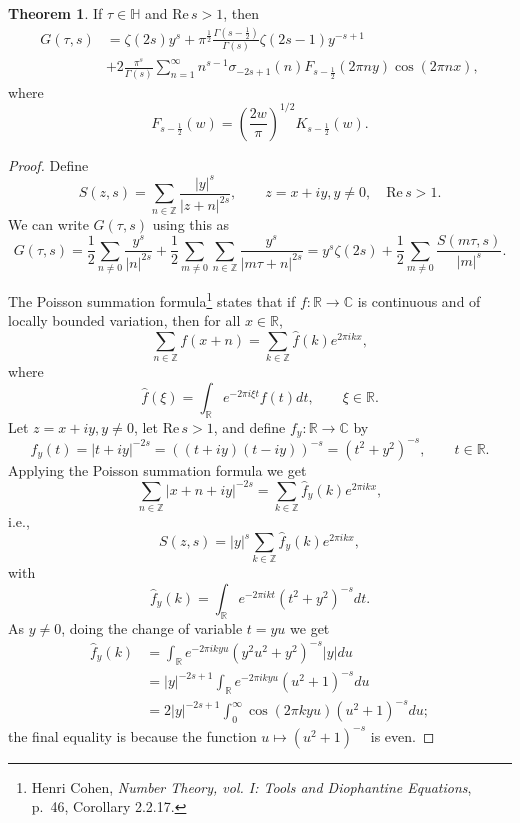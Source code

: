 \documentclass{article}
\def\Re{\ensuremath{\mathrm{Re}}\,}
\theoremstyle{definition}
\newtheorem{theorem}{Theorem}
\theoremstyle{definition}
\begin{document}
\begin{theorem}
If  $\tau \in \mathbb{H}$ and $\Re s>1$, then
\begin{align*}
G(\tau,s)&= \zeta(2s)y^s   +\pi^{\frac{1}{2}} \frac{ \Gamma\left(s-\frac{1}{2}\right)}{\Gamma(s)}  \zeta(2s-1)y^{-s+1}\\
&+2 \frac{\pi^s}{\Gamma(s)} \sum_{n=1}^\infty n^{s-1} \sigma_{-2s+1}(n) F_{s-\frac{1}{2}}(2\pi ny) \cos(2\pi nx),
\end{align*}
where
\[
F_{s-\frac{1}{2}}(w)=\left(\frac{2w}{\pi}\right)^{1/2} K_{s-\frac{1}{2}}(w).
\]
\label{GFourier}
\end{theorem}
\begin{proof}
Define 
\[
S(z,s) = \sum_{n \in \mathbb{Z}} \frac{|y|^s}{|z+n|^{2s}}, \qquad z=x+iy, y\neq 0,
\quad \Re s >1.
\]
We can write $G(\tau,s)$ using this as
\[
G(\tau,s)=\frac{1}{2} \sum_{n \neq 0} \frac{y^s}{|n|^{2s}}
+\frac{1}{2} \sum_{m \neq 0} \sum_{n \in \mathbb{Z}} \frac{y^s}{|m\tau+n|^{2s}}
=y^s \zeta(2s) +\frac{1}{2}\sum_{m \neq 0} \frac{S(m\tau,s)}{|m|^s}.
\]

The Poisson summation formula\footnote{Henri Cohen, {\em Number Theory, vol. I: Tools and Diophantine Equations}, p.~46, Corollary 2.2.17.}
states that if $f:\mathbb{R} \to \mathbb{C}$ is continuous and of locally  bounded variation, then
for all $x \in \mathbb{R}$,
\[
\sum_{n \in \mathbb{Z}} f(x+n) = \sum_{k \in \mathbb{Z}} \widehat{f}(k) e^{2\pi ikx},
\]
where
\[
\widehat{f}(\xi) = \int_\mathbb{R} e^{-2\pi i\xi t} f(t) dt, \qquad \xi \in \mathbb{R}.
\]
Let $z=x+iy, y \neq 0$, let $\Re s>1$, and define $f_y:\mathbb{R} \to \mathbb{C}$ by
\[
f_y(t)=|t+iy|^{-2s} =((t+iy)(t-iy))^{-s} = (t^2+y^2)^{-s}, \qquad t \in \mathbb{R}.
\]
Applying the Poisson summation formula we get
\[
\sum_{n \in \mathbb{Z}} |x+n+iy|^{-2s} = \sum_{k \in \mathbb{Z}} \widehat{f}_y(k) e^{2\pi ikx},
\]
i.e.,
\begin{equation}
S(z,s) = |y|^s \sum_{k \in \mathbb{Z}} \widehat{f}_y(k) e^{2\pi ikx},
\label{SPoisson}
\end{equation}
with
\[
\widehat{f}_y(k) = \int_{\mathbb{R}} e^{-2\pi ikt} (t^2+y^2)^{-s} dt.
\]
As $y \neq 0$, doing the change of variable $t=yu$ we get
\begin{align*}
\widehat{f}_y(k)&=\int_{\mathbb{R}} e^{-2\pi ikyu} (y^2u^2 +y^2)^{-s} |y|du\\
&=|y|^{-2s+1} \int_{\mathbb{R}} e^{-2\pi ikyu} (u^2+1)^{-s} du\\
&=2|y|^{-2s+1} \int_0^\infty \cos(2\pi kyu) (u^2+1)^{-s} du;
\end{align*}
the final equality is because the function $u \mapsto (u^2+1)^{-s}$ is even. 


\end{proof}
\end{document}
